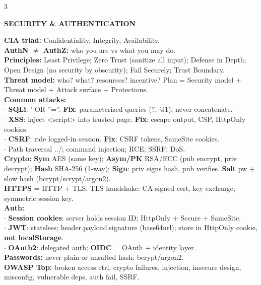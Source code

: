 \documentclass[10pt,letterpaper]{article}
\newenvironment{topic}[1]{%
  \par\addvspace{1.5pt}%
  \noindent\colorbox{hdrBG}{%
    \begin{minipage}{\dimexpr\linewidth-2\fboxsep\relax}%
      \centering\bfseries\sffamily\fontsize{6pt}{7pt}\selectfont\color{hdrFG}\MakeUppercase{#1}%
    \end{minipage}%
  }\par\nobreak\vskip0.5pt%
  \begingroup\setlength{\leftskip}{0pt}\setlength{\rightskip}{0pt}%
}{%
  \endgroup\par\addvspace{0.5pt}%
}
\newcommand{\warn}[1]{\textcolor{warnC}{\textbf{#1}}}
\newcommand{\ok}[1]{\textcolor{okC}{\textbf{#1}}}
\newcommand{\hd}[1]{\textcolor{accent}{\textbf{#1}}}
\newcommand{\cn}[1]{{\ttfamily\small #1}}
\begin{document}
\begin{multicols*}{3}

\begin{topic}{Security \& Authentication}
\hd{CIA triad:} Confidentiality, Integrity, Availability.\\
\hd{AuthN $\neq$ AuthZ:} who you are vs what you may do.\\
\hd{Principles:} Least Privilege; Zero Trust (sanitize all input); Defense in Depth; Open Design (no security by obscurity); Fail Securely; Trust Boundary.\\
\hd{Threat model:} who? what? resources? incentive? Plan = Security model + Threat model + Attack surface + Protections.\\
\hd{Common attacks:}\\
$\cdot$ \warn{SQLi}: \cn{' OR ''=''}. \ok{Fix}: parameterized queries (\cn{?}, \cn{@1}); never concatenate.\\
$\cdot$ \warn{XSS}: inject \cn{<script>} into trusted page. \ok{Fix}: escape output, CSP, HttpOnly cookies.\\
$\cdot$ \warn{CSRF}: ride logged-in session. \ok{Fix}: CSRF tokens, SameSite cookies.\\
$\cdot$ Path traversal \cn{../}; command injection; RCE; SSRF; DoS.\\
\hd{Crypto:} \textbf{Sym} AES (same key); \textbf{Asym/PK} RSA/ECC (pub encrypt, priv decrypt); \textbf{Hash} SHA-256 (1-way); \textbf{Sign}: priv signs hash, pub verifies. \textbf{Salt} pw + slow hash (bcrypt/scrypt/argon2).\\
\hd{HTTPS} = HTTP + TLS. TLS handshake: CA-signed cert, key exchange, symmetric session key.\\
\hd{Auth:}\\
$\cdot$ \textbf{Session cookies}: server holds session ID; HttpOnly + Secure + SameSite.\\
$\cdot$ \textbf{JWT}: stateless; \cn{header.payload.signature} (base64url); store in HttpOnly cookie, \warn{not localStorage}.\\
$\cdot$ \textbf{OAuth2}: delegated auth; \textbf{OIDC} = OAuth + identity layer.\\
\hd{Passwords:} never plain or unsalted hash; bcrypt/argon2.\\
\hd{OWASP Top:} broken access ctrl, crypto failures, injection, insecure design, misconfig, vulnerable deps, auth fail, SSRF.
\end{topic}


\end{multicols*}
\end{document}
